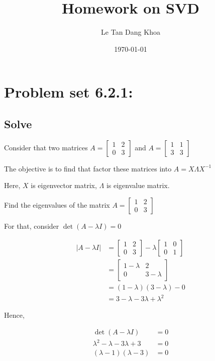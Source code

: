 \documentclass{article}
\title{Homework on SVD }
\author{Le Tan Dang Khoa}
\date\today
\begin{document}
\maketitle 
\section*{Problem set 6.2.1:}
\subsection*{Solve}
Consider that two matrices $A=\left[\begin{array}{ll}1 & 2 \\ 0 & 3\end{array}\right]$ and $A=\left[\begin{array}{ll}1 & 1 \\ 3 & 3\end{array}\right]$

The objective is to find that factor these matrices into $A=X \Lambda X^{-1}$

Here, $X$ is eigenvector matrix, $\Lambda$ is eigenvalue matrix.

Find the eigenvalues of the matrix $A=\left[\begin{array}{ll}1 & 2 \\ 0 & 3\end{array}\right]$

For that, consider $\operatorname{det}(A-\lambda I)=0$

$$
\begin{aligned}
|A-\lambda I| & =\left[\begin{array}{ll}
1 & 2 \\
0 & 3
\end{array}\right]-\lambda\left[\begin{array}{ll}
1 & 0 \\
0 & 1
\end{array}\right] \\
& =\left[\begin{array}{cc}
1-\lambda & 2 \\
0 & 3-\lambda
\end{array}\right] \\
& =(1-\lambda)(3-\lambda)-0 \\
& =3-\lambda-3 \lambda+\lambda^{2}
\end{aligned}
$$

Hence,

$$
\begin{aligned}
\operatorname{det}(A-\lambda I) & =0 \\
\lambda^{2}-\lambda-3 \lambda+3 & =0 \\
(\lambda-1)(\lambda-3) & =0
\end{aligned}
$$
\end{document}
